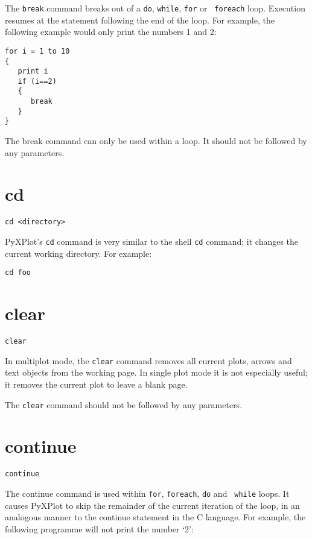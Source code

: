 The {\tt break} command breaks out of a {\tt do}, {\tt while}, {\tt for} or {\tt
foreach} loop.  Execution resumes at the statement following the end of the
loop.  For example, the following example would only print the numbers 1 and 2:

\begin{verbatim}
for i = 1 to 10
{
   print i
   if (i==2) 
   {
      break
   }
}
\end{verbatim}
      
The break command can only be used within a loop.  It should not be followed by
any parameters.

\section{cd}

\begin{verbatim}
cd <directory>
\end{verbatim}

PyXPlot's {\tt cd} command is very similar to the shell {\tt cd} command; it 
changes the current working directory. For example:

\begin{verbatim}
cd foo
\end{verbatim}

\section{clear}

\begin{verbatim}
clear
\end{verbatim}

In multiplot mode, the {\tt clear} command removes all current plots, arrows
and text objects from the working page. In single plot mode it is not
especially useful; it removes the current plot to leave a blank page.

The {\tt clear} command should not be followed by any parameters.

\section{continue}

\begin{verbatim}
continue
\end{verbatim}

The continue command is used within {\tt for}, {\tt foreach}, {\tt do} and {\tt
while} loops.  It causes PyXPlot to skip the remainder of the current iteration
of the loop, in an analogous manner to the continue statement in the C language.
For example, the following programme will not print the number `2':

